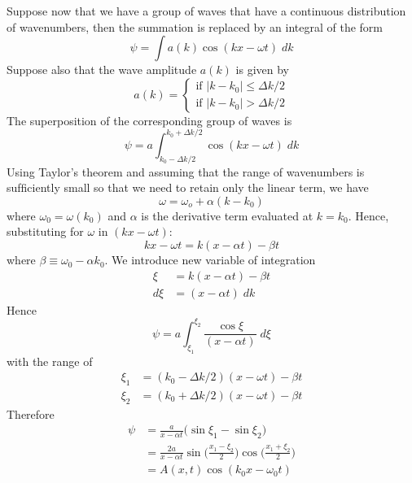 \documentclass[../../../main.tex]{subfiles}
\begin{document}
Suppose now that we have a group of waves that have a continuous distribution of wavenumbers, then the summation is replaced by an integral of the form
\begin{equation*}
    \psi=\int a(k)\cos (kx-\omega t)\;dk
\end{equation*}
Suppose also that the wave amplitude $a(k)$ is given by
\begin{equation*}
    a(k)=\begin{cases}
        \text{if } |k - k_0| \leq   \Delta k/2\\
        \text{if } |k - k_0| >   \Delta k/2
    \end{cases}
\end{equation*}
The superposition of the corresponding group of waves is
\begin{equation*}
    \psi=a\int_{k_0-\Delta k/2}^{k_0+\Delta k/2}\cos (kx-\omega t)\;dk
\end{equation*}
Using Taylor's theorem and assuming that the range of wavenumbers is sufﬁciently small so that we need to retain only the linear term, we have
\begin{equation*}
    \omega = \omega_o + \alpha(k - k_0)
\end{equation*}
where $\omega_0 = \omega(k_0)$ and $\alpha$ is the derivative term evaluated at $k=k_0$. Hence, substituting for $\omega$ in $(kx - \omega t)$:
\begin{equation*}
    kx - \omega t = k(x - \alpha t) - \beta t
\end{equation*}
where $\beta \equiv \omega_0 - \alpha k_0$. We introduce new variable of integration 
\begin{align*}
    \xi&=k(x - \alpha t) - \beta t\\
    d\xi&= (x - \alpha t)\;dk
\end{align*}
Hence
\begin{equation*}
    \psi=a\int_{\xi_1}^{\xi_2}\frac{\cos \xi}{(x - \alpha t)}\;d\xi
\end{equation*}
with the range of 
\begin{align*}
    \xi_1&=(k_0 -  \Delta k/2)(x - \omega t) - \beta t\\
    \xi_2&=(k_0 +  \Delta k/2)(x - \omega t) - \beta t
\end{align*}
Therefore 
\begin{align*}
    \psi&=\frac{a}{x-\alpha t}\big(\sin\xi_1-\sin\xi_2\big)\\
    &=\frac{2a}{x-\alpha t}\sin \big(\frac{x_1-\xi_2}{2}\big) \cos \big(\frac{x_1+\xi_2}{2}\big)\\
    &=A(x, t) \cos(k_0x - \omega_0 t)
\end{align*}
\end{document}
